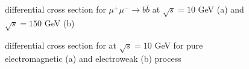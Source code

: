 \documentclass[12pt,letterpaper]{article}
\begin{document}
\begin{figure}[!ht]
\centering
{}
\caption{differential cross section for $\mu^+\mu^-\rightarrow b\bar{b}$ at $\sqrt{s} = 10$ GeV (a) and  $\sqrt{s} = 150$ GeV (b)}
\label{diffCS}
\end{figure}



\begin{figure}[!ht]
\centering
{}
\caption{differential cross section for at $\sqrt{s} = 10$ GeV for pure electromagnetic (a) and electroweak (b) process}
\label{150gev_contrib}
\end{figure}
\end{document}
